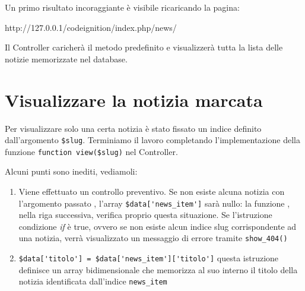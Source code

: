 
Un primo risultato incoraggiante è visibile ricaricando la pagina:

\begin{code}
http://127.0.0.1/codeignition/index.php/news/
\end{code}

Il Controller caricherà il metodo predefinito e visualizzerà tutta la lista delle notizie memorizzate nel database. 

\section*{Visualizzare la notizia marcata}
Per visualizzare solo una certa notizia è stato fissato un indice definito dall'argomento \verb|$slug|. Terminiamo il lavoro completando l'implementazione della funzione \verb|function view($slug)| nel Controller.


Alcuni punti sono inediti, vediamoli:

\begin{enumerate}
\item Viene effettuato un controllo preventivo. Se non esiste alcuna notizia con l'argomento passato , l'array \verb|$data['news_item']| sarà nullo: la funzione , nella riga successiva, verifica proprio questa situazione. Se l'istruzione condizione \textit{if} è true, ovvero se non esiste alcun indice slug corrispondente ad una notizia, verrà visualizzato un messaggio di errore tramite \verb|show_404()|
\item \verb|$data['titolo'] = $data['news_item']['titolo']| questa istruzione definisce un array bidimensionale che memorizza al suo interno il titolo della notizia identificata dall'indice \verb|news_item|
\end{enumerate}

